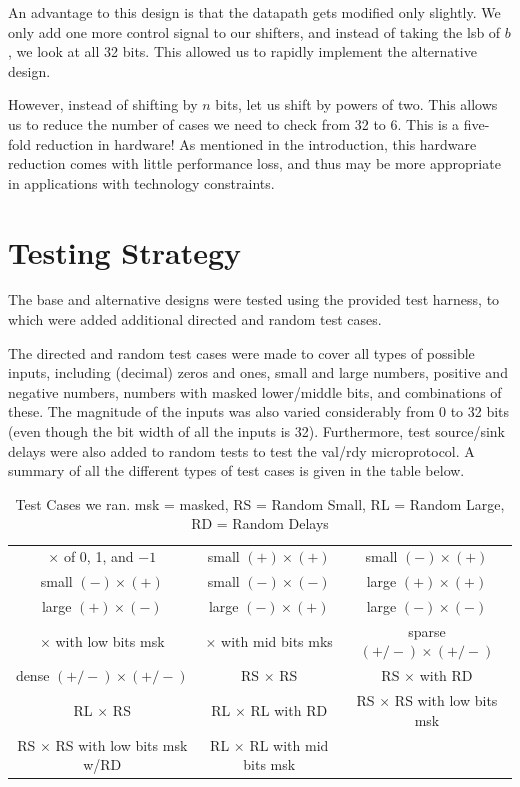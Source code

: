 \documentclass[11pt]{article}
\begin{document}
An advantage to this design is that the datapath gets modified only slightly.
We only add one more control signal to our shifters, and instead of taking the lsb of $b$, we look at all 32 bits.
This allowed us to rapidly implement the alternative design.

However, instead of shifting by $n$ bits, let us shift by powers of two.
This allows us to reduce the number of cases we need to check from 32 to 6.
This is a five-fold reduction in hardware! As mentioned in the introduction, this hardware reduction comes with little performance loss, and thus may be more appropriate in applications with technology constraints.   


\section{Testing Strategy}

The base and alternative designs were tested using the provided test harness, to which were added additional directed and random test cases.

The directed and random test cases were made to cover all types of possible inputs, including (decimal) zeros and ones, small and large numbers, positive and negative numbers, numbers with masked lower/middle bits, and combinations of these. The magnitude of the inputs was also varied considerably from 0 to 32 bits (even though the bit width of all the inputs is 32). Furthermore, test source/sink delays were also added to random tests to test the val/rdy microprotocol. A summary of all the different types of test cases is given in the table below.

\begin{center}
\begin{table}[h]
\begin{tabular}{c | c | c}
$\times$ of 0, 1, and $-1$ & small $(+) \times (+)$ & small $(-) \times (+)$ \\
small $(-) \times (+)$ & small $(-) \times (-)$ & large $(+) \times (+)$      \\
large $(+) \times (-)$               &
large $(-) \times (+)$               &
large $(-) \times (-)$               \\
$\times$ with low bits msk              &
$\times$ with mid bits mks              &
sparse $(+/-) \times (+/-)$          \\
dense  $(+/-) \times (+/-)$          &
RS $\times$ RS                       &
RS $\times$ with RD                  \\
RL $\times$ RS                       &
RL $\times$ RL with RD                  &
RS $\times$ RS with low bits msk           \\
RS $\times$ RS with low bits msk w/RD      &
RL $\times$ RL with mid bits msk           &  \\
                                                 
\end{tabular}
\caption{Test Cases we ran. msk = masked, RS = Random Small, RL = Random Large, RD = Random Delays}
\end{table}
\end{center}
\end{document}
